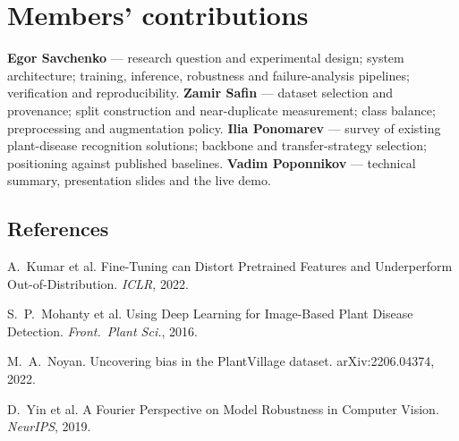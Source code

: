 \documentclass[10pt,a4paper,twocolumn]{article}
\begin{document}
\section{Members' contributions}

\noindent
\textbf{Egor Savchenko} --- research question and experimental design; system architecture; training,
inference, robustness and failure-analysis pipelines; verification and reproducibility.
\textbf{Zamir Safin} --- dataset selection and provenance; split construction and near-duplicate
measurement; class balance; preprocessing and augmentation policy.
\textbf{Ilia Ponomarev} --- survey of existing plant-disease recognition solutions; backbone and
transfer-strategy selection; positioning against published baselines.
\textbf{Vadim Poponnikov} --- technical summary, presentation slides and the live demo.

{\scriptsize
\setlength{\parskip}{0pt}
\subsection*{References}
\noindent
[1] A.~Kumar et al. Fine-Tuning can Distort Pretrained Features and Underperform Out-of-Distribution. \emph{ICLR}, 2022.
\par\noindent
[2] S.~P.~Mohanty et al. Using Deep Learning for Image-Based Plant Disease Detection. \emph{Front.\ Plant Sci.}, 2016.
\par\noindent
[3] M.~A.~Noyan. Uncovering bias in the PlantVillage dataset. arXiv:2206.04374, 2022.
\par\noindent
[4] D.~Yin et al. A Fourier Perspective on Model Robustness in Computer Vision. \emph{NeurIPS}, 2019.
}
\end{document}
